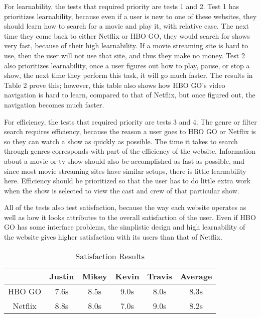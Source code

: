 \documentclass[11pt]{article}
\begin{document}
For learnability, the tests that required priority are tests 1 and 2. Test 1 has prioritizes learnability, because even if a user is new to one of these websites, they should learn how to search for a movie and play it, with relative ease. The next time they come back to either Netflix or HBO GO, they would search for shows very fast, because of their high learnability. If a movie streaming site is hard to use, then the user will not use that site, and thus they make no money. Test 2 also prioritizes learnability, once a user figures out how to play, pause, or stop a show, the next time they perform this task, it will go much faster. The results in Table 2 prove this; however, this table also shows how HBO GO's video navigation is hard to learn, compared to that of Netflix, but once figured out, the navigation becomes much faster.

For efficiency, the tests that required priority are tests 3 and 4. The genre or filter search requires efficiency, because the reason a user goes to HBO GO or Netflix is so they can watch a show as quickly as possible. The time it takes to search through genres corresponds with part of the efficiency of the website. Information about a movie or tv show should also be accomplished as fast as possible, and since most movie streaming sites have similar setups, there is little learnability here. Efficiency should be prioritized so that the user has to do little extra work when the show is selected to view the cast and crew of that particular show.

All of the tests also test satisfaction, because the way each website operates as well as how it looks attributes to the overall satisfaction of the user. Even if HBO GO has some interface problems, the simplistic design and high learnability of the website gives higher satisfaction with its users than that of Netflix.

\begin{table}[ht]
\caption{Satisfaction Results} 				%
\centering 									%
\begin{tabular}{|c|c c c c|c|} %
\hline\hline 									%
   &Justin& Mikey&Kevin&Travis&Average  \\ [0.5ex] 	    %
\hline 									    %
HBO GO  &7.6s & 8.5s&9.0s&8.0s&8.3s          \\			 %
\hline
Netflix &8.8s&8.0s&7.0s&9.0s&8.2s                             \\ [0.5ex]
\hline
\end{tabular}
\label{table:nonlin} %
\end{table}
\end{document}
